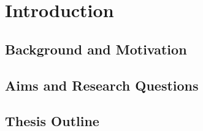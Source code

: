 \def\baselinestretch{1}

\chapter{Introduction}

\def\baselinestretch{1.66}



\section{Background and Motivation}




\section{Aims and Research Questions}




\section{Thesis Outline}






















